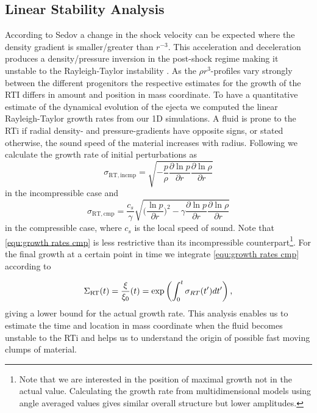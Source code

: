 \documentclass[fleqn,usenatbib]{mnras}
\begin{document}
\subsection{Linear Stability Analysis}
\label{sec:Linear Stability Analysis}
According to Sedov \cite{Sedov1961} a change in the shock velocity can be expected where the density gradient is smaller/greater than $r^{-3}$. This acceleration and deceleration produces a density/pressure inversion in the post-shock regime making it unstable to the Rayleigh-Taylor instability \cite{Chevalier1978}. As the $\rho r^3 $-profiles vary strongly between the different progenitors the respective estimates for the growth of the RTI differs in amount and position in mass coordinate.
To have a quantitative estimate of the dynamical evolution of the ejecta we computed the linear Rayleigh-Taylor growth rates from our 1D simulations. A fluid is prone to the RTi if radial density- and pressure-gradients have opposite signs, or stated otherwise, the sound speed of the material increases with radius. Following \cite{Mueller1991} we calculate the growth rate of initial perturbations as
\begin{equation}
  \label{equ:growth rates incmp}
  \sigma_{\mathrm{RT,incmp}} = \sqrt{- \frac{p}{\rho}\frac{\partial \ln p}{\partial r}\frac{\partial \ln \rho}{\partial r}}
\end{equation}
in the incompressible case and
\begin{equation}
  \sigma_{\mathrm{RT, cmp}} = \frac{c_{s}}{\gamma}\sqrt{\Big(\frac{\ln p}{\partial r}\Big)^ 2 - \gamma \frac{\partial \ln p}{\partial r}\frac{\partial \ln \rho}{\partial r}}\label{equ:growth rates cmp}
\end{equation}
in the compressible case, where $c_s$ is the local speed of sound. Note that \autoref{equ:growth rates cmp} is less restrictive than its incompressible counterpart\footnote{Note that we are interested in the position of maximal growth not in the actual value. Calculating the growth rate from multidimensional models using angle averaged values gives similar overall structure but lower amplitudes.}. 
For the final growth at a certain point in time we integrate \autoref{equ:growth rates cmp} according to

\begin{equation}
  \Sigma_{\rm RT}(t) = \frac{\xi}{\xi_0}(t) = \exp \left(\int_0^t \sigma_{RT} (t') dt' \right),\label{equ:growth rates int}
\end{equation}
giving a lower bound for the actual growth rate. This analysis enables us to estimate the time and location in mass coordinate when the fluid becomes unstable to the RTi and helps us to understand the origin of possible fast moving clumps of material.
\end{document}
